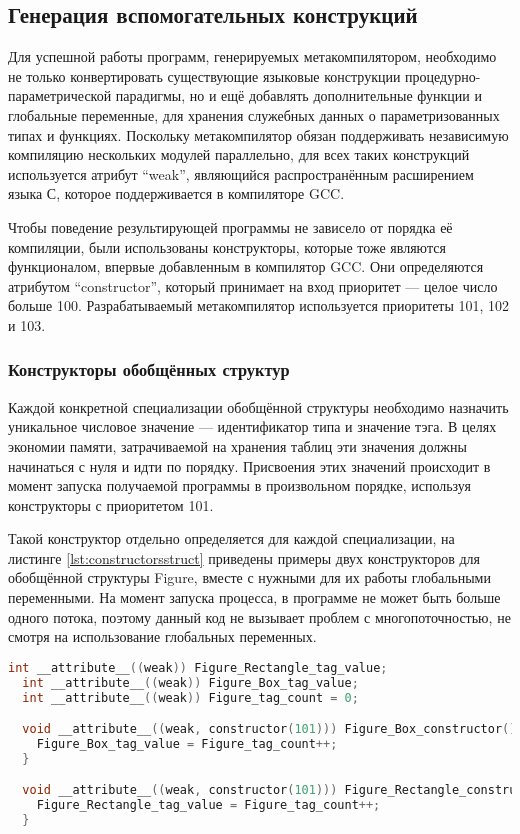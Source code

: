 \subsection{Генерация вспомогательных конструкций}

Для успешной работы программ, генерируемых метакомпилятором, необходимо не только конвертировать существующие языковые конструкции процедурно-параметрической парадигмы, но и ещё добавлять дополнительные функции и глобальные переменные, для хранения служебных данных о параметризованных типах и функциях.
Поскольку метакомпилятор обязан поддерживать независимую компиляцию нескольких модулей параллельно, для всех таких конструкций используется атрибут ``weak'', являющийся распространённым расширением языка С, которое поддерживается в компиляторе GCC.

Чтобы поведение результирующей программы не зависело от порядка её компиляции, были использованы конструкторы, которые тоже являются функционалом, впервые добавленным в компилятор GCC.
Они определяются атрибутом ``constructor'', который принимает на вход приоритет --- целое число больше 100.
Разрабатываемый метакомпилятор используется приоритеты 101, 102 и 103.

\subsubsection{Конструкторы обобщённых структур}

Каждой конкретной специализации обобщённой структуры необходимо назначить уникальное числовое значение --- идентификатор типа и значение тэга.
В целях экономии памяти, затрачиваемой на хранения таблиц эти значения должны начинаться с нуля и идти по порядку.
Присвоения этих значений происходит в момент запуска получаемой программы в произвольном порядке, используя конструкторы с приоритетом 101.

Такой конструктор отдельно определяется для каждой специализации, на листинге \ref{lst:constructorsstruct} приведены примеры двух конструкторов для обобщённой структуры Figure, вместе с нужными для их работы глобальными переменными.
На момент запуска процесса, в программе не может быть больше одного потока, поэтому данный код не вызывает проблем с многопоточностью, не смотря на использование глобальных переменных.

\begin{lstlisting}[language=c, caption={Конструкторы обобщённой структуры}, label={lst:constructorsstruct}]
  int __attribute__((weak)) Figure_Rectangle_tag_value;
  int __attribute__((weak)) Figure_Box_tag_value;
  int __attribute__((weak)) Figure_tag_count = 0;

  void __attribute__((weak, constructor(101))) Figure_Box_constructor() {
    Figure_Box_tag_value = Figure_tag_count++;
  }

  void __attribute__((weak, constructor(101))) Figure_Rectangle_constructor() {
    Figure_Rectangle_tag_value = Figure_tag_count++;
  }
\end{lstlisting}

